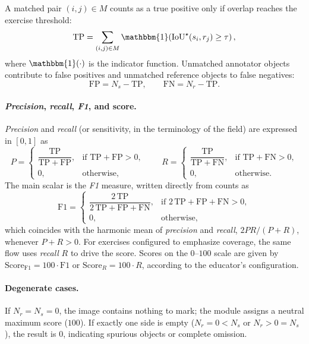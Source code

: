 \documentclass[runningheads]{llncs}
\begin{document}
A matched pair $(i,j)\in M$ counts as a true positive only if overlap reaches the exercise threshold:
\begin{equation}
\mathrm{TP}=\sum_{(i,j)\in M}\mathbbm{1}\!\left(\mathrm{IoU}^{\star}(s_i,r_j)\ge \tau\right),
\end{equation}
where $\mathbbm{1}(\cdot)$ is the indicator function. Unmatched annotator objects contribute to false positives and unmatched reference objects to false negatives:
\begin{equation}
\mathrm{FP}=N_s-\mathrm{TP},\qquad \mathrm{FN}=N_r-\mathrm{TP}.
\end{equation}

\paragraph{\emph{Precision}, \emph{recall}, \emph{F1}, and score.}
\emph{Precision} and \emph{recall} (or sensitivity, in the terminology of the field) are expressed in $[0,1]$ as
\begin{equation}
P=\begin{cases}
\dfrac{\mathrm{TP}}{\mathrm{TP}+\mathrm{FP}}, & \text{if } \mathrm{TP}+\mathrm{FP}>0,\\
0, & \text{otherwise},
\end{cases}
\qquad
R=\begin{cases}
\dfrac{\mathrm{TP}}{\mathrm{TP}+\mathrm{FN}}, & \text{if } \mathrm{TP}+\mathrm{FN}>0,\\
0, & \text{otherwise}.
\end{cases}
\end{equation}
The main scalar is the \emph{F1} measure, written directly from counts as
\begin{equation}
\mathrm{F1}=
\begin{cases}
\dfrac{2\,\mathrm{TP}}{2\,\mathrm{TP}+\mathrm{FP}+\mathrm{FN}}, & \text{if } 2\,\mathrm{TP}+\mathrm{FP}+\mathrm{FN}>0,\\
0, & \text{otherwise},
\end{cases}
\end{equation}
which coincides with the harmonic mean of \emph{precision} and \emph{recall}, $2PR/(P+R)$, whenever $P+R>0$. For exercises configured to emphasize coverage, the same flow uses \emph{recall} $R$ to drive the score. Scores on the $0$--$100$ scale are given by $\mathrm{Score}_{\mathrm{F1}}=100\cdot \mathrm{F1}$ or $\mathrm{Score}_{R}=100\cdot R$, according to the educator's configuration.

\paragraph{Degenerate cases.}
If $N_r=N_s=0$, the image contains nothing to mark; the module assigns a neutral maximum score ($100$). If exactly one side is empty ($N_r=0<N_s$ or $N_r>0=N_s$), the result is $0$, indicating spurious objects or complete omission.
\end{document}
